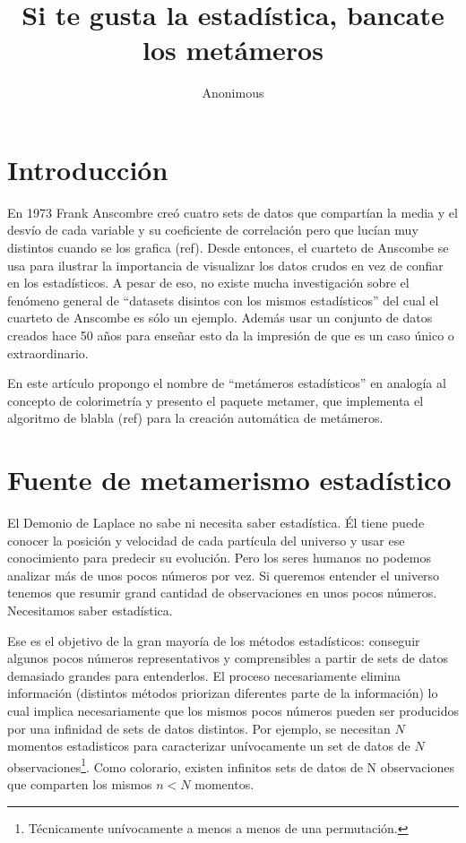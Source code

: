 \documentclass[runningheads]{llncs}
\begin{document}
%
\title{Si te gusta la estadística, bancate los metámeros}
%

%
\author{Anonimous}

%
\maketitle
%
\begin{abstract}
 

\end{abstract}

\section{Introducción}

En 1973 Frank Anscombre creó cuatro sets de datos que compartían la
media y el desvío de cada variable y su coeficiente de correlación pero
que lucían muy distintos cuando se los grafica (ref). Desde entonces, el
cuarteto de Anscombe se usa para ilustrar la importancia de visualizar
los datos crudos en vez de confiar en los estadísticos. A pesar de eso,
no existe mucha investigación sobre el fenómeno general de ``datasets
disintos con los mismos estadísticos'' del cual el cuarteto de Anscombe
es sólo un ejemplo. Además usar un conjunto de datos creados hace 50
años para enseñar esto da la impresión de que es un caso único o
extraordinario.

En este artículo propongo el nombre de ``metámeros estadísticos'' en
analogía al concepto de colorimetría y presento el paquete metamer, que
implementa el algoritmo de blabla (ref) para la creación automática de
metámeros.

\section{Fuente de metamerismo estadístico}

El Demonio de Laplace no sabe ni necesita saber estadística. Él tiene
puede conocer la posición y velocidad de cada partícula del universo y
usar ese conocimiento para predecir su evolución. Pero los seres humanos
no podemos analizar más de unos pocos números por vez. Si queremos
entender el universo tenemos que resumir grand cantidad de observaciones
en unos pocos números. Necesitamos saber estadística.

Ese es el objetivo de la gran mayoría de los métodos estadísticos:
conseguir algunos pocos números representativos y comprensibles a partir
de sets de datos demasiado grandes para entenderlos. El proceso
necesariamente elimina información (distintos métodos priorizan
diferentes parte de la información) lo cual implica necesariamente que
los mismos pocos números pueden ser producidos por una infinidad de sets
de datos distintos. Por ejemplo, se necesitan \(N\) momentos
estadisticos para caracterizar unívocamente un set de datos de \(N\)
observaciones\footnote{Técnicamente unívocamente a menos a menos de una permutación.}.
Como colorario, existen infinitos sets de datos de N observaciones que
comparten los mismos \(n < N\) momentos.
\end{document}
